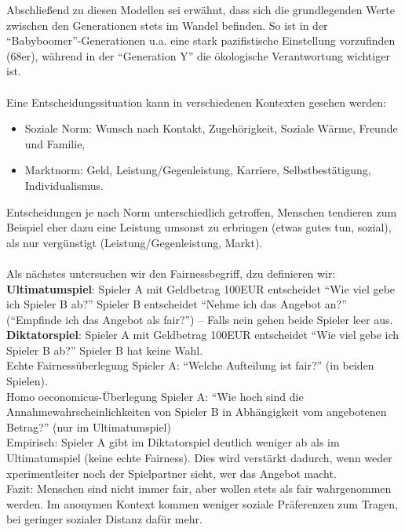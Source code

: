 Abschließend zu diesen Modellen sei erwähnt, dass sich die grundlegenden Werte zwischen den Generationen stets im Wandel befinden. So ist in der ``Babyboomer''-Generationen u.a. eine stark pazifistische Einstellung vorzufinden (68er), während in der ``Generation Y'' die ökologische Verantwortung wichtiger ist.\\
\ \\
Eine Entscheidungssituation kann in verschiedenen Kontexten gesehen werden:
\begin{itemize}
	\item Soziale Norm: Wunsch nach Kontakt, Zugehörigkeit, Soziale Wärme, Freunde und Familie,
	\item Marktnorm: Geld, Leistung/Gegenleistung, Karriere, Selbstbestätigung, Individualismus.
\end{itemize}
Entscheidungen je nach Norm unterschiedlich getroffen, Menschen tendieren zum Beispiel eher dazu eine Leistung umsonst zu erbringen (etwas gutes tun, sozial), als nur vergünstigt (Leistung/Gegenleistung, Markt).\\
\ \\
Als nächstes untersuchen wir den Fairnessbegriff, dzu definieren wir:\\
\textbf{Ultimatumspiel}: Spieler A mit Geldbetrag 100EUR entscheidet ``Wie viel gebe ich Spieler B ab?'' Spieler B entscheidet ``Nehme ich das Angebot an?''  (``Empfinde ich das Angebot als fair?'') -- Falls nein gehen beide Spieler leer aus.\\
\textbf{Diktatorspiel}: Spieler A mit Geldbetrag 100EUR entscheidet ``Wie viel gebe ich Spieler B ab?'' Spieler B hat keine Wahl.\\
Echte Fairnessüberlegung Spieler A: ``Welche Aufteilung ist fair?'' (in beiden Spielen).\\
Homo oeconomicus-Überlegung Spieler A: ``Wie hoch sind die Annahmewahrscheinlichkeiten von Spieler B in Abhängigkeit vom angebotenen Betrag?'' (nur im Ultimatumspiel)\\
Empirisch: Spieler A gibt im Diktatorspiel deutlich weniger ab als im Ultimatumspiel (keine echte Fairness). Dies wird verstärkt dadurch, wenn weder xperimentleiter noch der Spielpartner sieht, wer das Angebot macht.\\
Fazit: Menschen sind nicht immer fair, aber wollen stets als fair wahrgenommen werden. Im anonymen Kontext kommen weniger soziale Präferenzen zum Tragen, bei geringer sozialer Distanz dafür mehr.

